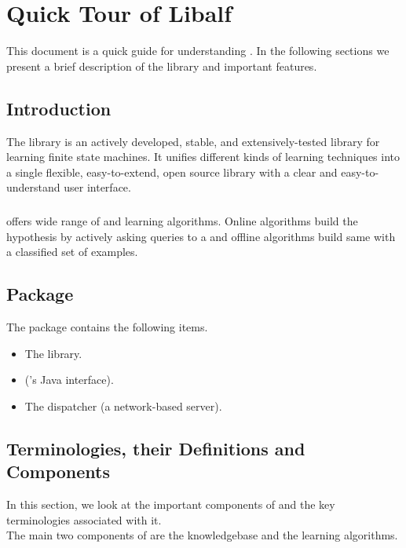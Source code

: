\chapter{Quick Tour of Libalf}
This document is a quick guide for understanding \libalf. In the following sections we present a brief description of the library and important features. 

\section{Introduction}
The \libalf library is an actively developed, stable, and extensively-tested library for learning finite state machines. It unifies different kinds of learning techniques into a single flexible, easy-to-extend, open source library with a clear and easy-to-understand
user interface. 
\paragraph{}
\libalf offers wide range of \offline and \online learning algorithms. Online algorithms build the hypothesis by actively asking queries to a \teacher and offline algorithms build same with a classified set of examples. 

\section{\libalf Package}
The \libalf package contains the following items.
\begin{itemize}
  \item The \libalf \cpp library.
  \item \jalf (\libalf's Java interface).
  \item The dispatcher (a network-based \libalf server).
\end{itemize}

\section{Terminologies, their Definitions and \libalf Components}
In this section, we look at the important components of \libalf and the key terminologies associated with it. \\
The main two components of \libalf are the knowledgebase and the learning algorithms.
